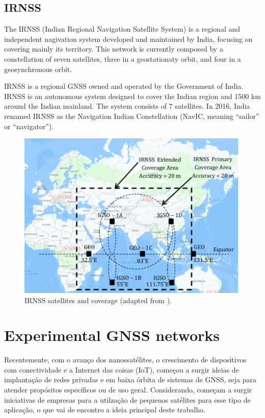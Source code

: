 \subsection{IRNSS}

The IRNSS (Indian Regional Navigation Satellite System) \cite{irnss} is a regional and independent nagivation system developed and maintained by India, focusing on covering mainly its territory. This network is currently composed by a constellation of seven satellites, three in a geostationaty orbit, and four in a geosynchronous orbit.

IRNSS is a regional GNSS owned and operated by the Government of India. IRNSS is an autonomous system designed to cover the Indian region and 1500 km around the Indian mainland. The system consists of 7 satellites. In 2016, India renamed IRNSS as the Navigation Indian Constellation (NavIC, meaning ``sailor'' or ``navigator'').

\begin{figure}[!ht]
    \begin{center}
        \includegraphics[width=0.8\columnwidth]{figures/irnss}
        \caption{IRNSS satellites and coverage (adapted from \cite{thombre2015}).}
        \label{fig:irnss}
    \end{center}
\end{figure}

\section{Experimental GNSS networks}

Recentemente, com o avanço dos nanossatélites, o crescimento de dispositivos com conectividade e a Internet das coisas (IoT), começou a surgir ideias de implantação de redes privadas e em baixa órbita de sistemas de GNSS, seja para atender propósitos específicos ou de uso geral. Considerando, começam a surgir iniciativas de empresas para a utilzação de pequenos satélites para esse tipo de aplicação, o que vai de encontro a ideia principal deste trabalho.

